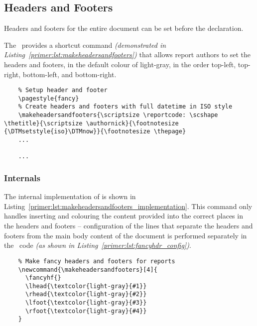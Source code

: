 \subsection{Headers and Footers}
Headers and footers for the entire document can be set before the  declaration.

The \uswdwmspkg\ provides a shortcut command \textit{(demonstrated in Listing~\ref{primer:lst:makeheadersandfooters})} that allows report authors to set the headers and footers, in the default colour of \textcolor{light-gray}{light-gray}, in the order top-left, top-right, bottom-left, and bottom-right.

\begin{listing}[H]
  \captionsetup{skip=\skiplistingcaptionlen}
  \begin{verbatim}
    % Setup header and footer
    \pagestyle{fancy}
    % Create headers and footers with full datetime in ISO style
    \makeheadersandfooters{\scriptsize \reportcode: \scshape \thetitle}{\scriptsize \authornick}{\footnotesize {\DTMsetstyle{iso}\DTMnow}}{\footnotesize \thepage}
    ...
    
    ...
  \end{verbatim}
  \caption{\texttt{\textbackslash makeheadersandfooters} command example}
  \label{primer:lst:makeheadersandfooters}
\end{listing}

\subsubsection*{Internals}

The internal implementation of  is shown in Listing~\ref{primer:lst:makeheadersandfooters_implementation}. This command only handles inserting and colouring the content provided into the correct places in the headers and footers -- configuration of the lines that separate the headers and footers from the main body content of the document is performed separately in the \uswdwmspkg\ code \textit{(as shown in Listing~\ref{primer:lst:fancyhdr_config})}.

\begin{listing}[H]
  \captionsetup{skip=\skiplistingcaptionlen}
  \begin{verbatim}
    % Make fancy headers and footers for reports
    \newcommand{\makeheadersandfooters}[4]{
      \fancyhf{}
      \lhead{\textcolor{light-gray}{#1}}
      \rhead{\textcolor{light-gray}{#2}}
      \lfoot{\textcolor{light-gray}{#3}}
      \rfoot{\textcolor{light-gray}{#4}}
    }
  \end{verbatim}
  \caption{\texttt{\textbackslash makeheadersandfooters} internal implementation}
  \label{primer:lst:makeheadersandfooters_implementation}
\end{listing}

